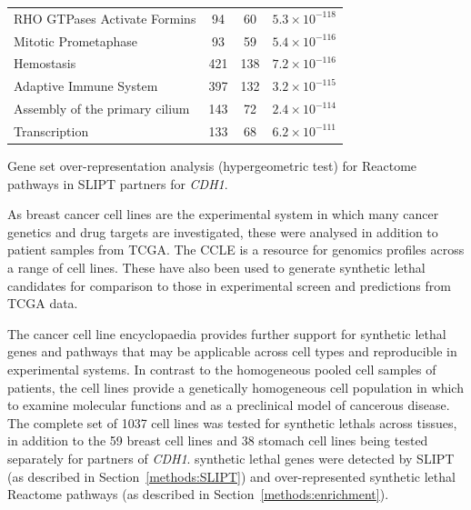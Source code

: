 \begin{table}[!b]
{\begin{threeparttable}
\begin{tabular}{lccc}
  \rowcolor{black!10}
  RHO GTPases Activate Formins &  94 &  60 & $5.3 \times 10^{-118}$ \\ 
  \rowcolor{black!5}
  Mitotic Prometaphase &  93 &  59 & $5.4 \times 10^{-116}$ \\ 
  \rowcolor{black!10}
  Hemostasis & 421 & 138 & $7.2 \times 10^{-116}$ \\ 
  \rowcolor{black!5}
  Adaptive Immune System & 397 & 132 & $3.2 \times 10^{-115}$ \\ 
  \rowcolor{black!10}
  Assembly of the primary cilium & 143 &  72 & $2.4 \times 10^{-114}$ \\ 
  \rowcolor{black!5}
  Transcription & 133 &  68 & $6.2 \times 10^{-111}$ \\ 
   \hline
\end{tabular}
\begin{tablenotes}
\raggedright \small
Gene set over-representation analysis (hypergeometric test) for Reactome pathways in \gls{SLIPT} partners for \textit{CDH1}.
\end{tablenotes}
\end{threeparttable}
}
\end{table}

As breast cancer cell lines are the experimental system in which many cancer genetics and drug targets are investigated, these were analysed in addition to patient samples from \gls{TCGA}. The \gls{CCLE} is a resource for \glspl{genomic} profiles across a range of cell lines. These have also been used to generate \gls{synthetic lethal} candidates for comparison to those in experimental screen and predictions from \gls{TCGA}  data.

The cancer cell line encyclopaedia provides further support for \gls{synthetic lethal} genes and pathways that may be applicable across cell types and reproducible in experimental systems. In contrast to the homogeneous pooled cell samples of patients,  the cell lines provide a genetically homogeneous cell population in which to examine molecular functions and as a preclinical model of cancerous disease. The complete set of 1037 cell lines was tested for \glspl{synthetic lethal} across tissues, in addition to the 59 breast cell lines and 38 stomach cell lines being tested separately for partners of \textit{CDH1}. \Gls{synthetic lethal} genes were detected by \gls{SLIPT} (as described in Section~\ref{methods:SLIPT}) and over-represented \gls{synthetic lethal} Reactome pathways (as described in Section~\ref{methods:enrichment}). 

